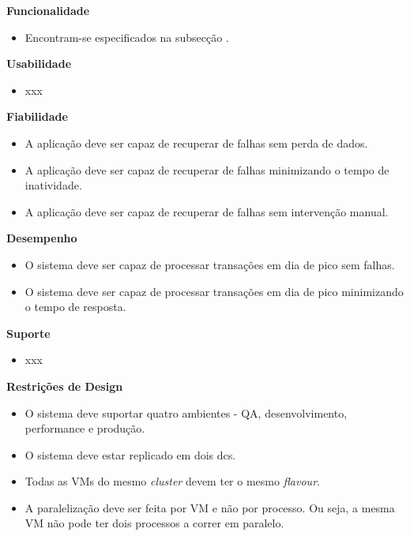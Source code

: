 \vspace{5mm}

\textbf{Funcionalidade}
\begin{itemize}
  \item Encontram-se especificados na subsecção .
\end{itemize}

\textbf{Usabilidade}
\begin{itemize}
  \item xxx
\end{itemize}

\textbf{Fiabilidade}
\begin{itemize}
  \item A aplicação deve ser capaz de recuperar de falhas sem perda de dados.
  \item A aplicação deve ser capaz de recuperar de falhas minimizando o tempo de inatividade.
  \item A aplicação deve ser capaz de recuperar de falhas sem intervenção manual.
\end{itemize}

\textbf{Desempenho}
\begin{itemize}
  \item O sistema deve ser capaz de processar transações em dia de pico sem falhas.
  \item O sistema deve ser capaz de processar transações em dia de pico minimizando o tempo de resposta.
\end{itemize}

\textbf{Suporte}
\begin{itemize}
  \item xxx
\end{itemize}

\textbf{Restrições de Design}
\begin{itemize}
  \item O sistema deve suportar quatro ambientes - \ac{QA}, desenvolvimento, 
    performance e produção.
  \item O sistema deve estar replicado em dois \glspl{dc}.
  \item Todas as \acp{VM} do mesmo \textit{\gls{cluster}} devem ter o mesmo \textit{\gls{flavour}}.
  \item A paralelização deve ser feita por \ac{VM} e não por processo. Ou seja, a mesma \ac{VM} 
    não pode ter dois processos a correr em paralelo.
\end{itemize}

